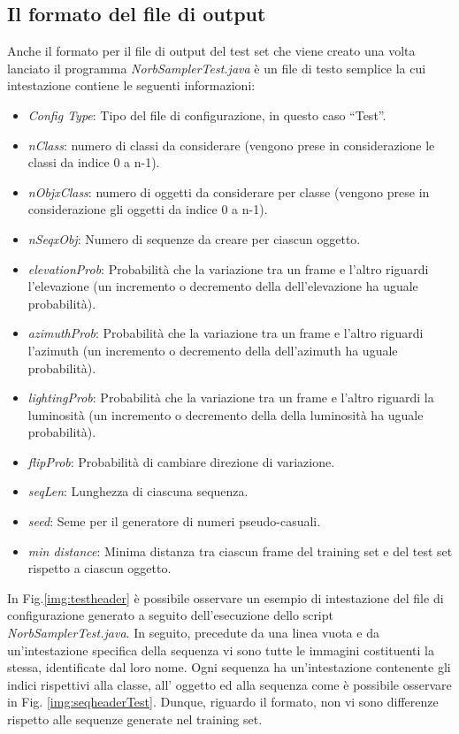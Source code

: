 \documentclass[paper=a4, fontsize=11pt]{scrartcl} %
\numberwithin{equation}{section} %
\numberwithin{figure}{section} %
\numberwithin{table}{section} %
\begin{document}
\subsection{Il formato del file di output}
Anche il formato per il file di output del test set che viene creato una volta lanciato il programma \emph{NorbSamplerTest.java} è un file di testo semplice la cui intestazione contiene le seguenti informazioni:

\begin{itemize}
\item \emph{Config Type}: Tipo del file di configurazione, in questo caso ``Test''.
\item \emph{nClass}: numero di classi da considerare (vengono prese in considerazione le classi da indice 0 a n-1).
\item \emph{nObjxClass}: numero di oggetti da considerare per classe (vengono prese in considerazione gli oggetti da indice 0 a n-1).
\item \emph{nSeqxObj}: Numero di sequenze da creare per ciascun oggetto.
\item \emph{elevationProb}: Probabilità che la variazione tra un frame e l'altro riguardi l'elevazione (un incremento o decremento della dell'elevazione ha uguale probabilità).
\item \emph{azimuthProb}: Probabilità che la variazione tra un frame e l'altro riguardi l'azimuth (un incremento o decremento della dell'azimuth ha uguale probabilità).
\item \emph{lightingProb}: Probabilità che la variazione tra un frame e l'altro riguardi la luminosità (un incremento o decremento della della luminosità ha uguale probabilità).
\item \emph{flipProb}: Probabilità di cambiare direzione di variazione.
\item \emph{seqLen}: Lunghezza di ciascuna sequenza.
\item \emph{seed}: Seme per il generatore di numeri pseudo-casuali.
\item \emph{min distance}: Minima distanza tra ciascun frame del training set e del test set rispetto a ciascun oggetto.
\end{itemize}

In Fig.\ref{img:testheader} è possibile osservare un esempio di intestazione del file di configurazione generato a seguito dell'esecuzione dello script \emph{NorbSamplerTest.java}.
In seguito, precedute da una linea vuota e da un'intestazione specifica della sequenza vi sono tutte le immagini costituenti la stessa, identificate dal loro nome.
Ogni sequenza ha un'intestazione contenente gli indici rispettivi alla classe, all' oggetto ed alla sequenza come è possibile osservare in Fig. \ref{img:seqheaderTest}. Dunque, riguardo il formato, non vi sono differenze rispetto alle sequenze generate nel training set.
\end{document}
